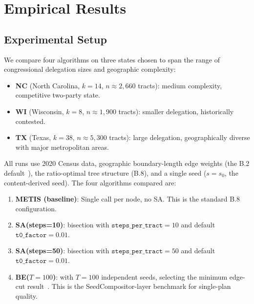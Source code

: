\section{Empirical Results}
\label{sec:empirical}

\subsection{Experimental Setup}

We compare four algorithms on three states chosen to span the range of
congressional delegation sizes and geographic complexity:
\begin{itemize}
\item \textbf{NC} (North Carolina, $k=14$, $n \approx 2{,}660$ tracts):
  medium complexity, competitive two-party state.
\item \textbf{WI} (Wisconsin, $k=8$, $n \approx 1{,}900$ tracts):
  smaller delegation, historically contested.
\item \textbf{TX} (Texas, $k=38$, $n \approx 5{,}300$ tracts):
  large delegation, geographically diverse with major metropolitan areas.
\end{itemize}

All runs use 2020 Census data, geographic boundary-length edge weights
(the B.2 default~\citep{b2paper}), the \geosec{} ratio-optimal tree structure
(B.8), and a single seed ($s = s_0$, the content-derived seed).
The four algorithms compared are:

\begin{enumerate}
\item \textbf{METIS (baseline)}: Single \metis{} call per node, no SA.
  This is the standard B.8 configuration.
\item \textbf{SA(steps=10)}: \sa{} bisection with $\mathtt{steps\_per\_tract} = 10$
  and default $\mathtt{t0\_factor} = 0.01$.
\item \textbf{SA(steps=50)}: \sa{} bisection with $\mathtt{steps\_per\_tract} = 50$
  and default $\mathtt{t0\_factor} = 0.01$.
\item \textbf{BE($T=100$)}: \be{} with $T=100$ independent seeds, selecting
  the minimum edge-cut result~\citep{h1paper}.
  This is the SeedCompositor-layer benchmark for single-plan quality.
\end{enumerate}


